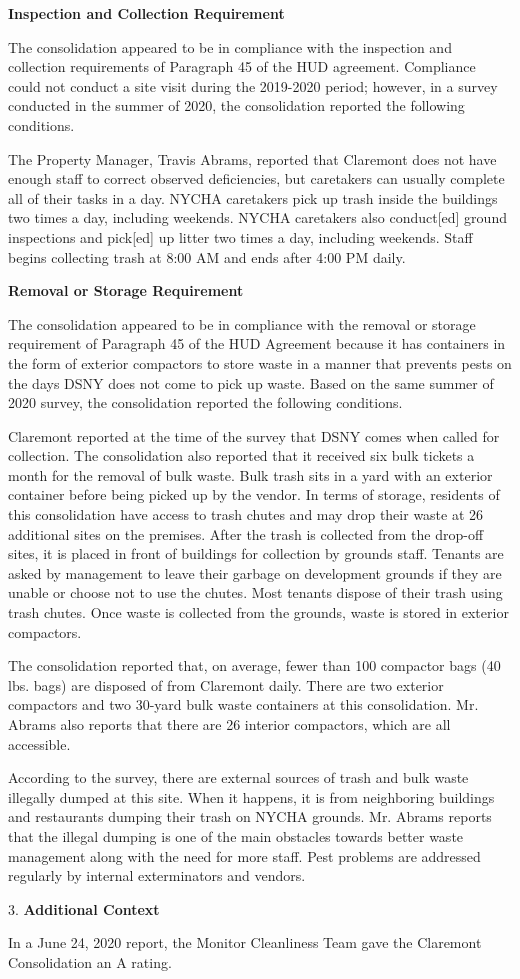 
\textbf{Inspection and Collection Requirement}

The consolidation appeared to be in compliance with the inspection and collection requirements of Paragraph 45 of the HUD agreement. Compliance could not conduct a site visit during the 2019-2020 period; however, in a survey conducted in the summer of 2020, the consolidation reported the following conditions.

The Property Manager, Travis Abrams, reported that Claremont does not have enough staff to correct observed deficiencies, but caretakers can usually complete all of their tasks in a day. NYCHA caretakers pick up trash inside the buildings two times a day, including weekends. NYCHA caretakers also conduct[ed] ground inspections and pick[ed] up litter two times a day, including weekends. Staff begins collecting trash at 8:00 AM and ends after 4:00 PM daily. 

\textbf{Removal or Storage Requirement}

The consolidation appeared to be in compliance with the  removal or storage requirement of Paragraph  45 of the HUD Agreement because it has containers in the form of exterior compactors to store waste in a manner that prevents pests on the days DSNY does not come to pick up waste. Based on the same summer of  2020 survey, the consolidation reported the following conditions.

Claremont reported at the time of the survey that DSNY comes when called for collection. The consolidation also reported that it received six bulk tickets a month for the removal of bulk waste. Bulk trash sits in a yard with an exterior container before being picked up by the vendor. In terms of storage, residents of this consolidation have access to trash chutes and may drop their waste at 26 additional sites on the premises. After the trash is collected from the drop-off sites, it is placed in front of buildings for collection by grounds staff. Tenants are asked by management to leave their garbage on development grounds if they are unable or choose not to use the chutes. Most tenants dispose of their trash using trash chutes. Once waste is collected from the grounds, waste is stored in exterior compactors. 

The consolidation reported that, on average, fewer than 100 compactor bags (40 lbs. bags) are disposed of from Claremont daily. There are two exterior compactors and two 30-yard bulk waste containers at this consolidation. Mr. Abrams also reports that there are 26 interior compactors, which are all accessible.

According to the survey, there are external sources of trash and bulk waste illegally dumped at this site. When it happens, it is from neighboring buildings and restaurants dumping their trash on NYCHA grounds. Mr. Abrams reports that the illegal dumping is one of the main obstacles towards better waste management along with the need for more staff. Pest problems are addressed regularly by internal exterminators and vendors.

3. \textbf{Additional Context} 

In a June 24, 2020 report, the Monitor Cleanliness Team gave the Claremont Consolidation an A rating. 